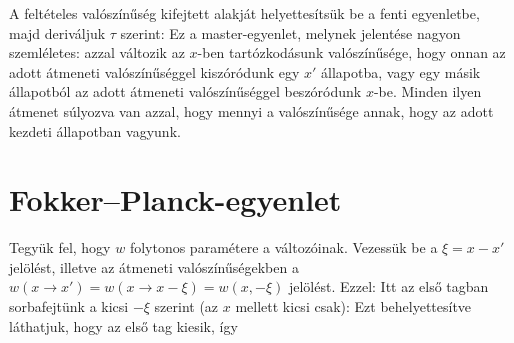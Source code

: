     A feltételes valószínűség kifejtett alakját helyettesítsük be a fenti egyenletbe, majd deriváljuk $\tau$ szerint:
    Ez a master-egyenlet, melynek jelentése nagyon szemléletes: azzal változik az $x$-ben tartózkodásunk valószínűsége, hogy onnan az adott átmeneti valószínűséggel kiszóródunk egy $x'$ állapotba, vagy egy másik állapotból az adott átmeneti valószínűséggel beszóródunk $x$-be.
   Minden ilyen átmenet súlyozva van azzal, hogy mennyi a valószínűsége annak, hogy az adott kezdeti állapotban vagyunk.

 \section{Fokker--Planck-egyenlet}
  
  Tegyük fel, hogy $w$ folytonos paramétere a változóinak.
   Vezessük be a $\xi=x-x'$ jelölést, illetve az átmeneti valószínűségekben a $w(x\to x')=w(x\to x-\xi)=w(x,-\xi)$ jelölést.
   Ezzel:
  Itt az első tagban sorbafejtünk a kicsi $-\xi$ szerint (az $x$ mellett kicsi csak):
  Ezt behelyettesítve láthatjuk, hogy az első tag kiesik, így

